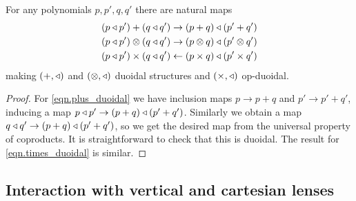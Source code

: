 \documentclass[Book-Poly]{subfiles}
\begin{document}


\begin{proposition}
For any polynomials $p,p',q,q'$ there are natural maps
\begin{align}\label{eqn.plus_duoidal}
	(p\mathbin{\triangleleft} p')+(q\mathbin{\triangleleft} q')&\to (p+q)\mathbin{\triangleleft}(p'+q')\\\label{eqn.otimes_duoidal}
	(p\mathbin{\triangleleft} p')\otimes(q\mathbin{\triangleleft} q')&\to(p\otimes q)\mathbin{\triangleleft}(p'\otimes q')\\\label{eqn.times_duoidal}
	(p\mathbin{\triangleleft} p')\times (q\mathbin{\triangleleft} q')&\leftarrow(p\times q)\mathbin{\triangleleft}(p'\times q')
\end{align}
making $(+,\mathbin{\triangleleft})$ and $(\otimes,\mathbin{\triangleleft})$ duoidal structures and $(\times,\mathbin{\triangleleft})$ op-duoidal.
\end{proposition}
\begin{proof}
For \eqref{eqn.plus_duoidal} we have inclusion maps $p\to p+q$ and $p'\to p'+q'$, inducing a map $p\mathbin{\triangleleft} p'\to(p+q)\mathbin{\triangleleft}(p'+q')$. Similarly we obtain a map $q\mathbin{\triangleleft} q'\to(p+q)\mathbin{\triangleleft}(p'+q')$, so we get the desired map from the universal property of coproducts. It is straightforward to check that this is duoidal. The result for \eqref{eqn.times_duoidal} is similar. 
\end{proof}


\subsection{Interaction with vertical and cartesian lenses} \label{subsec.comon.comp.prop.cart}
\end{document}
